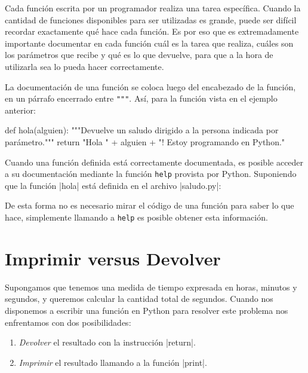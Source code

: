 Cada función escrita por un programador realiza una tarea específica.  Cuando
la cantidad de funciones disponibles para ser utilizadas es grande, puede ser
difícil recordar exactamente qué hace cada función.  Es por eso que es
extremadamente importante documentar en cada función cuál es la tarea que
realiza, cuáles son los parámetros que recibe y qué es lo que devuelve, para
que a la hora de utilizarla sea lo pueda hacer correctamente.

La documentación de una función se coloca luego del encabezado de la función,
en un párrafo encerrado entre \lstinline!"""!.  Así, para la función vista en
el ejemplo anterior:

\begin{codigo-python-sn}
def hola(alguien):
    """Devuelve un saludo dirigido a la persona indicada por parámetro."""
    return "Hola " + alguien + "! Estoy programando en Python."
\end{codigo-python-sn}

\begin{sabias_que}
Cuando una función definida está correctamente documentada, es posible acceder
a su documentación mediante la función \lstinline!help! provista por Python.
Suponiendo que la función |hola| está definida en el archivo |saludo.py|:


De esta forma no es necesario mirar el código de una función para saber lo que
hace, simplemente llamando a \lstinline!help! es posible obtener esta
información.
\end{sabias_que}

\section{Imprimir versus Devolver}

Supongamos que tenemos una medida de tiempo expresada en horas, minutos y
segundos, y queremos calcular la cantidad total de segundos. Cuando nos
disponemos a escribir una función en Python para resolver este problema nos
enfrentamos con dos posibilidades:

\begin{enumerate}
\item {\it Devolver} el resultado con la instrucción |return|.
\item {\it Imprimir} el resultado llamando a la función |print|.
\end{enumerate}

